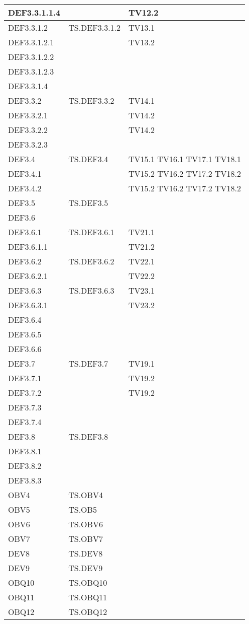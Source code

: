 \documentclass{scalatekids-article}
\begin{document}
\begin{longtable}[H]{|l|p{4cm}|p{4cm}|}
  \hline
  DEF3.3.1.1.4 & & TV12.2\\
  \hline
  DEF3.3.1.2 & TS.DEF3.3.1.2 & TV13.1\\
  \hline
  DEF3.3.1.2.1 & & TV13.2\\
  \hline
  DEF3.3.1.2.2 & & \\
  \hline
  DEF3.3.1.2.3 & & \\
  \hline
  DEF3.3.1.4 & & \\
  \hline
  DEF3.3.2 & TS.DEF3.3.2 & TV14.1\\
  \hline
  DEF3.3.2.1 & & TV14.2\\
  \hline
  DEF3.3.2.2 & & TV14.2\\
  \hline
  DEF3.3.2.3 & & \\ %
  \hline
  DEF3.4 & TS.DEF3.4 & TV15.1 TV16.1 TV17.1 TV18.1\\
  \hline
  DEF3.4.1 & & TV15.2 TV16.2 TV17.2 TV18.2\\
  \hline
  DEF3.4.2 & & TV15.2 TV16.2 TV17.2 TV18.2\\
  \hline
  DEF3.5 & TS.DEF3.5 & \\
  \hline
  DEF3.6 & & \\
  \hline
  DEF3.6.1 & TS.DEF3.6.1 & TV21.1\\
  \hline
  DEF3.6.1.1 & & TV21.2\\
  \hline
  DEF3.6.2 & TS.DEF3.6.2 & TV22.1\\
  \hline
  DEF3.6.2.1 & & TV22.2\\
  \hline
  DEF3.6.3 & TS.DEF3.6.3 & TV23.1\\
  \hline
  DEF3.6.3.1 & & TV23.2\\
  \hline
  DEF3.6.4 & & \\ %
  \hline
  DEF3.6.5 & & \\ %
  \hline
  DEF3.6.6 & & \\ %
  \hline
  DEF3.7 & TS.DEF3.7 & TV19.1\\
  \hline
  DEF3.7.1 & & TV19.2\\
  \hline
  DEF3.7.2 & & TV19.2\\
  \hline
  DEF3.7.3 & & \\
  \hline
  DEF3.7.4 & & \\
  \hline
  DEF3.8 & TS.DEF3.8 & \\
  \hline
  DEF3.8.1 & & \\
  \hline
  DEF3.8.2 & & \\
  \hline
  DEF3.8.3 & & \\
  \hline
  OBV4 & TS.OBV4 & \\
  \hline
  OBV5 & TS.OB5 & \\
  \hline
  OBV6 & TS.OBV6 & \\
  \hline
  OBV7 & TS.OBV7 & \\
  \hline
  DEV8 & TS.DEV8 & \\
  \hline
  DEV9 & TS.DEV9 & \\
  \hline
  OBQ10 & TS.OBQ10 & \\
  \hline
  OBQ11 & TS.OBQ11 & \\
  \hline
  OBQ12 & TS.OBQ12 & \\
  \hline
\end{longtable}
\end{document}
